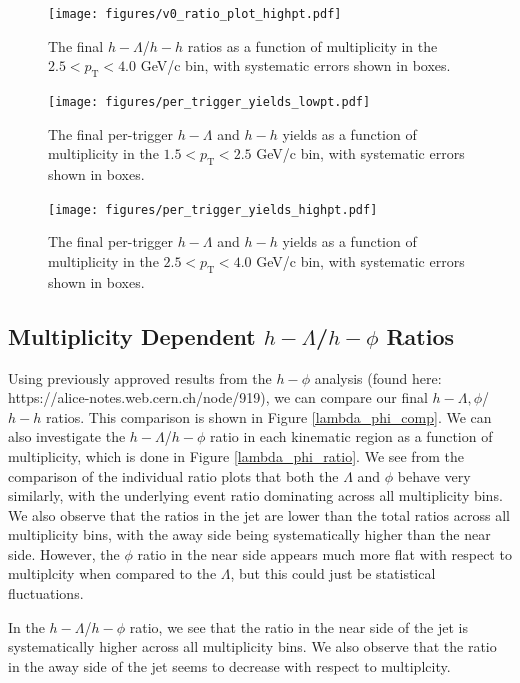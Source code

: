 \documentclass[ALICE,manyauthors]{ALICE_analysis_notes}
\begin{document}
\begin{figure}[ht]
\centering
\texttt{[image: figures/v0\_ratio\_plot\_highpt.pdf]}
\caption{The final $h-\Lambda$/$h-h$ ratios as a function of multiplicity in the $2.5 < p_{\text{T}} < 4.0$ GeV/c bin, with systematic errors shown in boxes.}
\label{high_momentum_ratio}
\end{figure}

\begin{figure}[ht]
\centering
\texttt{[image: figures/per\_trigger\_yields\_lowpt.pdf]}
\caption{The final per-trigger $h-\Lambda$ and $h-h$ yields as a function of multiplicity in the $1.5 < p_{\text{T}} < 2.5$ GeV/c bin, with systematic errors shown in boxes.}
\label{low_momentum_yield}
\end{figure}

\begin{figure}[ht]
\centering
\texttt{[image: figures/per\_trigger\_yields\_highpt.pdf]}
\caption{The final per-trigger $h-\Lambda$ and $h-h$ yields as a function of multiplicity in the $2.5 < p_{\text{T}} < 4.0$ GeV/c bin, with systematic errors shown in boxes.}
\label{high_momentum_yield}
\end{figure}

\subsection{Multiplicity Dependent $h-\Lambda$/$h-\phi$ Ratios}
Using previously approved results from the $h-\phi$ analysis (found here: https://alice-notes.web.cern.ch/node/919), we can compare our final $h-\Lambda, \phi$/$h-h$ ratios. This comparison is shown in Figure \ref{lambda_phi_comp}. We can also investigate the $h-\Lambda$/$h-\phi$ ratio in each kinematic region as a function of multiplicity, which is done in Figure \ref{lambda_phi_ratio}. We see from the comparison of the individual ratio plots that both the $\Lambda$ and $\phi$ behave very similarly, with the underlying event ratio dominating across all multiplicity bins. We also observe that the ratios in the jet are lower than the total ratios across all multiplicity bins, with the away side being systematically higher than the near side. However, the $\phi$ ratio in the near side appears much more flat with respect to multiplcity when compared to the $\Lambda$, but this could just be statistical fluctuations.

In the $h-\Lambda$/$h-\phi$ ratio, we see that the ratio in the near side of the jet is systematically higher across all multiplicity bins. We also observe that the ratio in the away side of the jet seems to decrease with respect to multiplcity.
\end{document}
